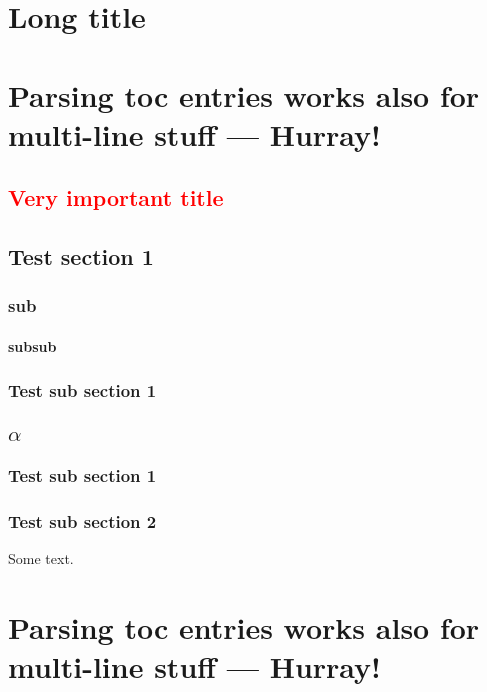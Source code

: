 \chapter[Short title]{Long title}

\chapter{Parsing {toc entries works
  also for} multi-line \texorpdfstring{stuff}{entries}
--- Hurray!}

\section{\texorpdfstring{\textcolor{red}{Very important title}} {Very important title}}

\section{Test section 1}

\subsection{sub}

\subsubsection{subsub}


\subsection{Test sub section 1}

\section{$\alpha$}

\subsection{Test sub section 1}

\subsection{Test sub section 2}
Some text.

\chapter[Parsing toc specific entries works 
  also for multi-line --- A second Hurray!]{Parsing {toc entries works
  also for} multi-line \texorpdfstring{stuff}{entries}
--- Hurray!}

